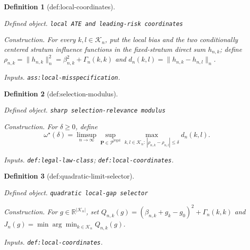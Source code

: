 \documentclass{article}
\newtheorem{definition}{Definition}
\begin{document}
\begin{definition}[def:local-coordinates]\label{def:local-coordinates}
\par\smallskip\noindent\emph{Defined object.} \texttt{local ATE and leading-\allowbreak{}risk coordinates}
\par\smallskip\noindent\emph{Construction.} For every \(k,l\in\mathcal K_n\), put the local bias and the two conditionally centered stratum influence functions in the fixed-stratum direct sum \(h_{n,k}\); define \(\rho_{n,k}=\|h_{n,k}\|_n^2=\beta_{n,k}^2+\Gamma_n(k,k)\) and \(d_n(k,l)=\|h_{n,k}-h_{n,l}\|_n\).
\par\smallskip\noindent\emph{Inputs.} \texttt{ass:\allowbreak{}local-\allowbreak{}misspecification}.
\end{definition}

\begin{definition}[def:selection-modulus]\label{def:selection-modulus}
\par\smallskip\noindent\emph{Defined object.} \texttt{sharp selection-\allowbreak{}relevance modulus}
\par\smallskip\noindent\emph{Construction.} For \(\delta\ge0\), define \[\omega^{\star}(\delta)=\limsup_{n\to\infty}\sup_{\mathbf P\in\mathcal P^{\mathrm{legal}}}\max_{k,l\in\mathcal K_n:\,|\rho_{n,k}-\rho_{n,l}|\le\delta}d_n(k,l).\]
\par\smallskip\noindent\emph{Inputs.} \texttt{def:\allowbreak{}legal-\allowbreak{}law-\allowbreak{}class}; \texttt{def:\allowbreak{}local-\allowbreak{}coordinates}.
\end{definition}

\begin{definition}[def:quadratic-limit-selector]\label{def:quadratic-limit-selector}
\par\smallskip\noindent\emph{Defined object.} \texttt{quadratic local-\allowbreak{}gap selector}
\par\smallskip\noindent\emph{Construction.} For \(g\in\mathbb R^{|\mathcal K_n|}\), set \(Q_{n,k}(g)=(\beta_{n,k}+g_k-g_0)^2+\Gamma_n(k,k)\) and \(J_n(g)=\min\arg\min_{k\in\mathcal K_n}Q_{n,k}(g)\).
\par\smallskip\noindent\emph{Inputs.} \texttt{def:\allowbreak{}local-\allowbreak{}coordinates}.
\end{definition}
\end{document}
